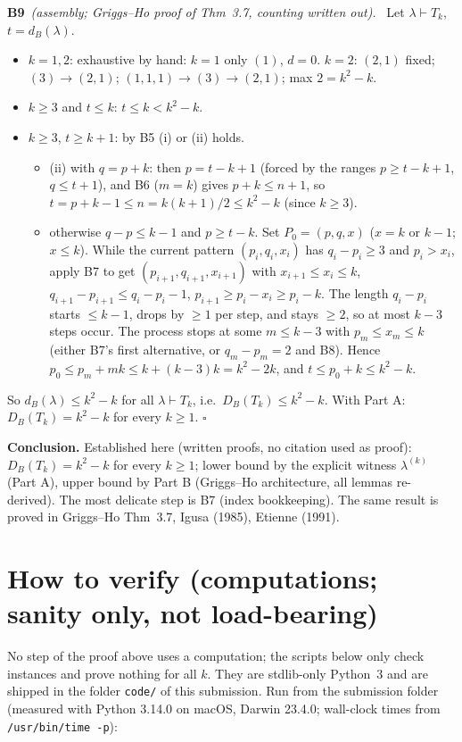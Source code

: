 \documentclass[11pt]{article}
\newcommand{\step}[2]{\par\medskip\noindent\textbf{#1}\ \textit{#2}\ }
\newcommand{\DB}{D_B}
\newcommand{\dB}{d_B}
\newcommand{\qedend}{\hfill$\square$}
\begin{document}
\step{B9}{(assembly; Griggs--Ho proof of Thm~3.7, counting written out).} Let $\lambda\vdash T_k$, $t=\dB(\lambda)$.
\begin{itemize}
\item $k=1,2$: exhaustive by hand: $k=1$ only $(1)$, $d=0$. $k=2$: $(2,1)$ fixed; $(3)\to(2,1)$; $(1,1,1)\to(3)\to(2,1)$; max $2=k^2-k$.
\item $k\ge3$ and $t\le k$: $t\le k<k^2-k$.
\item $k\ge3$, $t\ge k+1$: by B5 (i) or (ii) holds.
\begin{itemize}
\item (ii) with $q=p+k$: then $p=t-k+1$ (forced by the ranges $p\ge t-k+1$, $q\le t+1$), and B6 ($m=k$) gives $p+k\le n+1$, so $t=p+k-1\le n=k(k+1)/2\le k^2-k$ (since $k\ge3$).
\item otherwise $q-p\le k-1$ and $p\ge t-k$. Set $P_0=(p,q,x)$ ($x=k$ or $k-1$; $x\le k$). While the current pattern $(p_i,q_i,x_i)$ has $q_i-p_i\ge3$ and $p_i>x_i$, apply B7 to get $(p_{i+1},q_{i+1},x_{i+1})$ with $x_{i+1}\le x_i\le k$, $q_{i+1}-p_{i+1}\le q_i-p_i-1$, $p_{i+1}\ge p_i-x_i\ge p_i-k$. The length $q_i-p_i$ starts $\le k-1$, drops by $\ge1$ per step, and stays $\ge2$, so at most $k-3$ steps occur. The process stops at some $m\le k-3$ with $p_m\le x_m\le k$ (either B7's first alternative, or $q_m-p_m=2$ and B8). Hence $p_0\le p_m+mk\le k+(k-3)k=k^2-2k$, and $t\le p_0+k\le k^2-k$.
\end{itemize}
\end{itemize}
So $\dB(\lambda)\le k^2-k$ for all $\lambda\vdash T_k$, i.e.\ $\DB(T_k)\le k^2-k$. With Part A: $\DB(T_k)=k^2-k$ for every $k\ge1$. \qedend

\medskip
\noindent\textbf{Conclusion.} Established here (written proofs, no citation used as proof): $\DB(T_k)=k^2-k$ for every $k\ge1$; lower bound by the explicit witness $\lambda^{(k)}$ (Part A), upper bound by Part B (Griggs--Ho architecture, all lemmas re-derived). The most delicate step is B7 (index bookkeeping). The same result is proved in Griggs--Ho Thm~3.7, Igusa (1985), Etienne (1991).

\section{How to verify (computations; sanity only, not load-bearing)}\label{sec:verify}

No step of the proof above uses a computation; the scripts below only check instances and prove nothing for all $k$. They are stdlib-only Python~3 and are shipped in the folder \texttt{code/} of this submission. Run from the submission folder (measured with Python 3.14.0 on macOS, Darwin 23.4.0; wall-clock times from \texttt{/usr/bin/time -p}):
\end{document}
